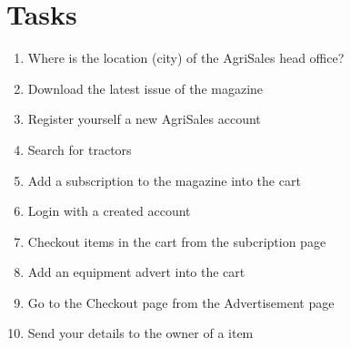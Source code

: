 \documentclass[11pt]{article}
\begin{document}
\section{Tasks}
	\begin{enumerate}
		\item Where is the location (city) of the AgriSales head office?
		\item Download the latest issue of the magazine
		\item Register yourself a new AgriSales account
		\item Search for tractors
		\item Add a subscription to the magazine into the cart
		\item Login with a created account
		\item Checkout items in the cart from the subcription page
		\item Add an equipment advert into the cart
		\item Go to the Checkout page from the Advertisement page
		\item Send your details to the owner of a item
	\end{enumerate}

\newpage
\end{document}
